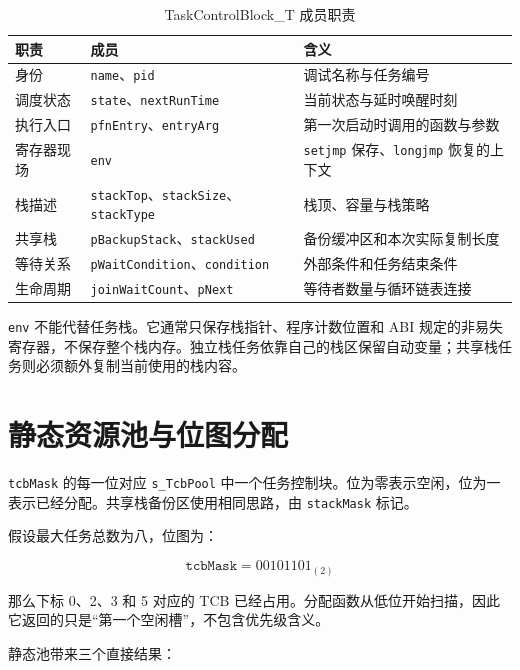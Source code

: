 \begin{table}[htbp]
\centering
\caption{TaskControlBlock\_T 成员职责} \label{tab:app-coro-tcb}
\begin{tabularx}{\textwidth}{llX}
\toprule
职责 & 成员 & 含义 \\
\midrule
身份 & \texttt{name}、\texttt{pid} & 调试名称与任务编号 \\
调度状态 & \texttt{state}、\texttt{nextRunTime} & 当前状态与延时唤醒时刻 \\
执行入口 & \texttt{pfnEntry}、\texttt{entryArg} & 第一次启动时调用的函数与参数 \\
寄存器现场 & \texttt{env} & \texttt{setjmp} 保存、\texttt{longjmp} 恢复的上下文 \\
栈描述 & \texttt{stackTop}、\texttt{stackSize}、\texttt{stackType} & 栈顶、容量与栈策略 \\
共享栈 & \texttt{pBackupStack}、\texttt{stackUsed} & 备份缓冲区和本次实际复制长度 \\
等待关系 & \texttt{pWaitCondition}、\texttt{condition} & 外部条件和任务结束条件 \\
生命周期 & \texttt{joinWaitCount}、\texttt{pNext} & 等待者数量与循环链表连接 \\
\bottomrule
\end{tabularx}
\end{table}

\texttt{env} 不能代替任务栈。它通常只保存栈指针、程序计数位置和 ABI 规定的非易失寄存器，不保存整个栈内存。独立栈任务依靠自己的栈区保留自动变量；共享栈任务则必须额外复制当前使用的栈内容。

\section{静态资源池与位图分配}

\texttt{tcbMask} 的每一位对应 \texttt{s\_TcbPool} 中一个任务控制块。位为零表示空闲，位为一表示已经分配。共享栈备份区使用相同思路，由 \texttt{stackMask} 标记。

假设最大任务总数为八，位图为：

\begin{equation}
\texttt{tcbMask}=00101101_{(2)}
\end{equation}

那么下标 0、2、3 和 5 对应的 TCB 已经占用。分配函数从低位开始扫描，因此它返回的只是“第一个空闲槽”，不包含优先级含义。

静态池带来三个直接结果：


